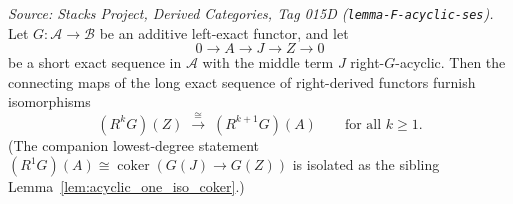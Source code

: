 \begin{lemma}
  \label{lem:acyclic_dimension_shift}
  \textit{Source: Stacks Project, Derived Categories, Tag 015D
  (\texttt{lemma-F-acyclic-ses}).}
  Let \(G : \mathcal{A} \to \mathcal{B}\) be an additive left-exact functor, and let
  \[
    0 \longrightarrow A \longrightarrow J \longrightarrow Z \longrightarrow 0
  \]
  be a short exact sequence in \(\mathcal{A}\) with the middle term \(J\)
  right-\(G\)-acyclic. Then the connecting maps of the long exact sequence of
  right-derived functors furnish isomorphisms
  \[
    (R^{k} G)(Z) \;\xrightarrow{\ \cong\ }\; (R^{k+1} G)(A)
    \qquad \text{for all } k \geq 1.
  \]
  (The companion lowest-degree statement
  \((R^{1} G)(A) \cong \operatorname{coker}(G(J) \to G(Z))\) is isolated as the
  sibling Lemma~\ref{lem:acyclic_one_iso_coker}.)
\end{lemma}

